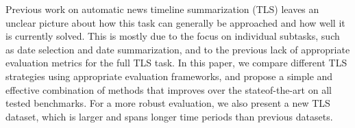 Previous work on automatic news timeline summarization (TLS) leaves an unclear picture about how this task can generally be approached and how well it is currently solved. This is mostly due to the focus on individual subtasks, such as date selection and date summarization, and to the previous lack of appropriate evaluation metrics for the full TLS task. In this paper, we compare different TLS strategies using appropriate evaluation frameworks, and propose a simple and effective combination of methods that improves over the stateof-the-art on all tested benchmarks. For a more robust evaluation, we also present a new TLS dataset, which is larger and spans longer time periods than previous datasets.
